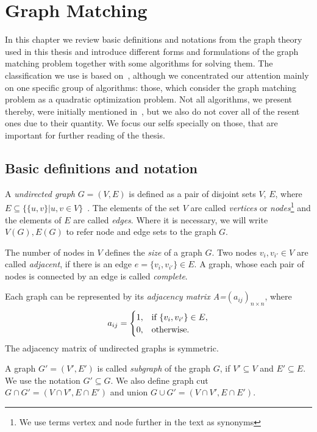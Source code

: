 
\chapter{Graph Matching}

In this chapter we review basic definitions and notations from the graph theory used in this thesis and introduce different forms and formulations of the graph matching problem together with some algorithms for solving them. The classification we use is based on~\cite{Conte2004}, although we concentrated our attention mainly on one specific group of algorithms: those, which consider the graph matching problem as a quadratic optimization problem. Not all algorithms, we present thereby, were initially mentioned in~\cite{Conte2004}, but we also do not cover all of the resent ones due to their quantity. We focus our selfs specially on those, that are important for further reading of the thesis.

\section{Basic definitions and notation}
A \emph{undirected graph} $G=(V,E)$ is defined as a pair of disjoint sets $V$, $E$, where $E\subseteq\{\{u,v\}| u, v\in V\}$~\cite{Diestel2000}. The elements of the set $V$ are called \emph{vertices} or \emph{nodes}\footnote{We use terms vertex and node further in the text as synonyms} and the elements of $E$ are called \emph{edges}. Where it is necessary, we will write $V(G), E(G)$ to refer node and edge sets to the graph $G$.

The number of nodes in $V$ defines the \emph{size} of a graph $G$.
Two nodes $v_{i},v_{i'}\in V$ are called \emph{adjacent}, if there is an edge $e=\{v_{i},v_{i'}\}\in E$. A graph, whose each pair of nodes is connected by an edge is called \emph{complete}.

Each graph can be represented by its \emph{adjacency matrix A=$(a_{ij})_{n\times n}$}, where 
\begin{equation*}\centering
a_{ij}=\begin{cases}
 1, & \text{if } \{v_{i},v_{i'}\}\in E, \\
 0, & \text{otherwise.} \\
\end{cases}
\end{equation*}
The adjacency matrix of undirected graphs is symmetric.

A graph $G'=(V',E')$ is called \emph{subgraph} of the graph $G$, if $V'\subseteq V$ and $E'\subseteq E$. We use the notation $G'\subseteq G$. We also define graph cut $G\cap G'=(V\cap V', E\cap E')$ and union $G\cup G'=(V\cap V', E\cap E')$.

